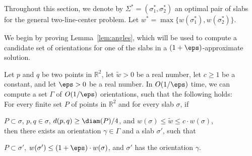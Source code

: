 Throughout this section, we denote by $\Sigma^* = (\sigma_1^*, \sigma_2^*)$ an optimal pair of slabs for the general two-line-center problem. Let $w^* = \max \{w(\sigma_1^*), w(\sigma_2^*) \}$.


We begin by proving Lemma~\ref{lem:angles}, which will be used to compute a candidate set of orientations for one of the slabs in a $(1+\eps)$-approximate solution.



\begin{lemma}
    \label{lem:angles}
    Let $p$ and $q$ be two points in $\mathbb R^2$, let $\widetilde w > 0$ be  a real number, let $c\ge 1$ be a constant, and let $\eps> 0$ be a real number.
    In $O(1/\eps)$ time, we can compute a set $\Gamma$ of $O(1/\eps)$ orientations, such that the following holds:\\
    For every finite set $P$ of points in $\mathbb R^2$ and for every slab $\sigma$, if 
    
     $P\subset \sigma$, 
     $p, q \in \sigma$, 
     $d(p,q) \ge \diam(P)/4$, and
     $w(\sigma) \le \widetilde w \le c\cdot w(\sigma)$,
    \\then there exists an orientation $\gamma\in \Gamma$ and a slab $\sigma'$, such that
    
     $P \subset \sigma'$, 
     $w(\sigma') \le (1+ \eps) \cdot w(\sigma)$, and
     $\sigma'$ has the orientation $\gamma$.
\end{lemma}



